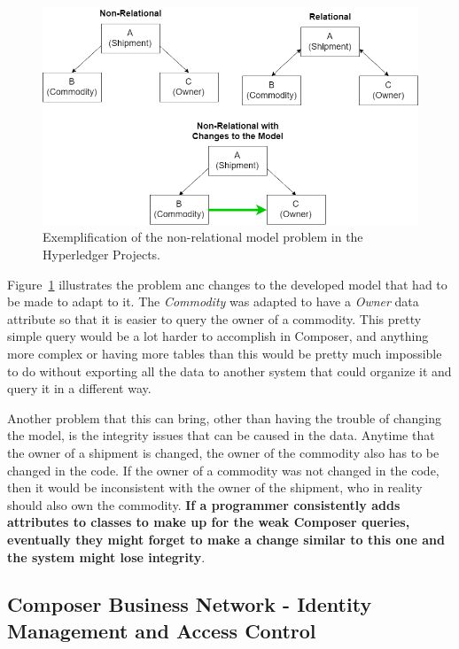 \begin{figure}[h]
    \centering
    \includegraphics[scale=0.40]{media/relational_problem.png}
    \caption[Exemplification of the non-relational model problem in the Hyperledger Projects.]{Exemplification of the non-relational model problem in the Hyperledger Projects.}
    \label{fig:relational_problem}
\end{figure}
Figure~\ref{fig:relational_problem} illustrates the problem anc changes to the developed model that had to be made to adapt to it. The \textit{Commodity} was adapted to have a \textit{Owner} data attribute so that it is easier to query the owner of a commodity. This pretty simple query would be a lot harder to accomplish in Composer, and anything more complex or having more tables than this would be pretty much impossible to do without exporting all the data to another system that could organize it and query it in a different way. 

Another problem that this can bring, other than having the trouble of changing the model, is the integrity issues that can be caused in the data. Anytime that the owner of a shipment is changed, the owner of the commodity also has to be changed in the code. If the owner of a commodity was not changed in the code, then it would be inconsistent with the owner of the shipment, who in reality should also own the commodity. \textbf{If a programmer consistently adds attributes to classes to make up for the weak Composer queries, eventually they might forget to make a change similar to this one and the system might lose integrity}.


\subsection{Composer Business Network - Identity Management and Access Control}

